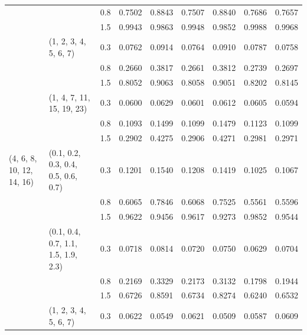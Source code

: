 \begin{table}[h]
\begin{tabular}{lllllllll}
                             			&                                     			& 0.8   	& 0.7502 	& 0.8843 	& 0.7507 	& 0.8840 	& 0.7686 	& 0.7657 \\
                             			&                                     			& 1.5   	& 0.9943 	& 0.9863 	& 0.9948 	& 0.9852 	& 0.9988 	& 0.9968 \\
                             			& (1, 2, 3, 4, 5, 6, 7)               		& 0.3   	& 0.0762 	& 0.0914 	& 0.0764 	& 0.0910 	& 0.0787 	& 0.0758 \\
                             			&                                     			& 0.8   	& 0.2660 	& 0.3817 	& 0.2661 	& 0.3812 	& 0.2739 	& 0.2697 \\
                             			&                                     			& 1.5   	& 0.8052 	& 0.9063 	& 0.8058 	& 0.9051 	& 0.8202 	& 0.8145 \\
                             			& (1, 4, 7, 11, 15, 19, 23)           		& 0.3   	& 0.0600 	& 0.0629 	& 0.0601 	& 0.0612 	& 0.0605 	& 0.0594 \\
                             			&                                     			& 0.8   	& 0.1093 	& 0.1499 	& 0.1099 	& 0.1479 	& 0.1123 	& 0.1099 \\
                             			&                                     			& 1.5   	& 0.2902 	& 0.4275 	& 0.2906 	& 0.4271 	& 0.2981 	& 0.2971 \\\hline
(4, 6, 8, 10, 12, 14, 16)    		& (0.1, 0.2, 0.3, 0.4, 0.5, 0.6, 0.7) 	& 0.3   	& 0.1201 	& 0.1540 	& 0.1208 	& 0.1419 	& 0.1025 	& 0.1067 \\
                             			&                                     			& 0.8   	& 0.6065 	& 0.7846 	& 0.6068 	& 0.7525 	& 0.5561 	& 0.5596 \\
                             			&                                     			& 1.5   	& 0.9622 	& 0.9456 	& 0.9617 	& 0.9273 	& 0.9852 	& 0.9544 \\
                             			& (0.1, 0.4, 0.7, 1.1, 1.5, 1.9, 2.3) 	& 0.3   	& 0.0718 	& 0.0814 	& 0.0720 	& 0.0750 	& 0.0629 	& 0.0704 \\
                             			&                                     			& 0.8   	& 0.2169 	& 0.3329 	& 0.2173 	& 0.3132 	& 0.1798 	& 0.1944 \\
                             			&                                     			& 1.5   	& 0.6726 	& 0.8591 	& 0.6734 	& 0.8274 	& 0.6240 	& 0.6532 \\
                             			& (1, 2, 3, 4, 5, 6, 7)               		& 0.3   	& 0.0622 	& 0.0549 	& 0.0621 	& 0.0509 	& 0.0587 	& 0.0609 \\

\end{tabular}
\end{table}
